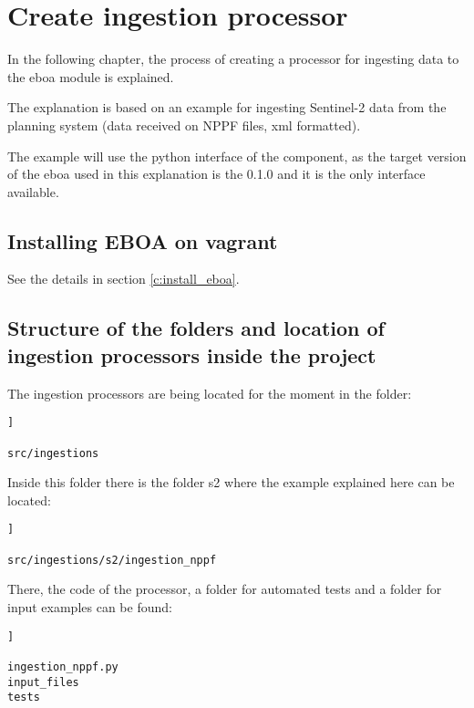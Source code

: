 \chapter{Create ingestion processor}

In the following chapter, the process of creating a processor for ingesting data to the \acrshort{eboa} module is explained.

The explanation is based on an example for ingesting Sentinel-2 data from the planning system (data received on NPPF files, xml formatted).

The example will use the python interface of the component, as the target version of the \acrshort{eboa} used in this explanation is the 0.1.0 and it is the only interface available.

\section{Installing EBOA on vagrant}

See the details in section \ref{c:install_eboa}.

\section{Structure of the folders and location of ingestion processors inside the project}

The ingestion processors are being located for the moment in the folder:

\begin{lstlisting}[breaklines=true, style=bash]]

src/ingestions

\end{lstlisting}

Inside this folder there is the folder s2 where the example explained here can be located:

\begin{lstlisting}[breaklines=true, style=bash]]

src/ingestions/s2/ingestion_nppf

\end{lstlisting}

There, the code of the processor, a folder for automated tests and a folder for input examples can be found:

\begin{lstlisting}[breaklines=true, style=bash]]

ingestion_nppf.py
input_files
tests

\end{lstlisting}

